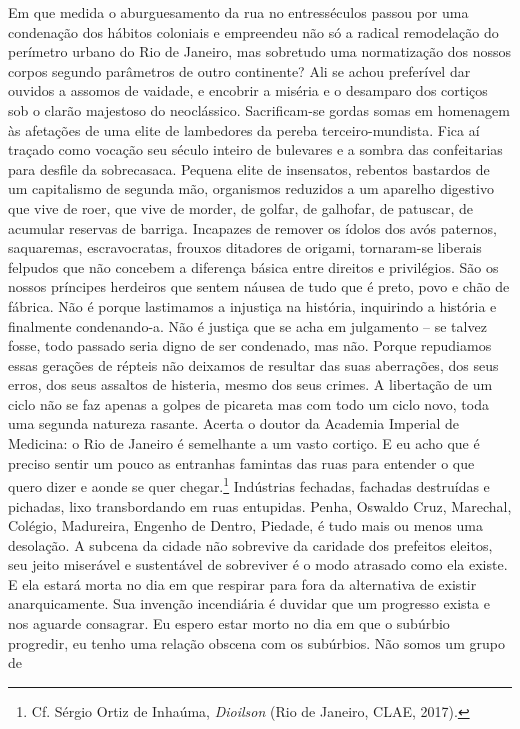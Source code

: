 Em que medida o aburguesamento da rua no entresséculos passou por uma
condenação dos hábitos coloniais e empreendeu não só a radical
remodelação do perímetro urbano do Rio de Janeiro, mas sobretudo uma
normatização dos nossos corpos segundo parâmetros de outro continente?
Ali se achou preferível dar ouvidos a assomos de vaidade, e encobrir a
miséria e o desamparo dos cortiços sob o clarão majestoso do
neoclássico. Sacrificam-se gordas somas em homenagem às afetações de uma
elite de lambedores da pereba terceiro-mundista. Fica aí traçado como
vocação seu século inteiro de bulevares e a sombra das confeitarias para
desfile da sobrecasaca. Pequena elite de insensatos, rebentos bastardos
de um capitalismo de segunda mão, organismos reduzidos a um aparelho
digestivo que vive de roer, que vive de morder, de golfar, de galhofar,
de patuscar, de acumular reservas de barriga. Incapazes de remover os
ídolos dos avós paternos, saquaremas, escravocratas, frouxos ditadores
de origami, tornaram-se liberais felpudos que não concebem a diferença
básica entre direitos e privilégios. São os nossos príncipes herdeiros
que sentem náusea de tudo que é preto, povo e chão de fábrica. Não é
porque lastimamos a injustiça na história, inquirindo a história e
finalmente condenando-a. Não é justiça que se acha em julgamento -- se
talvez fosse, todo passado seria digno de ser condenado, mas não. Porque
repudiamos essas gerações de répteis não deixamos de resultar das suas
aberrações, dos seus erros, dos seus assaltos de histeria, mesmo dos
seus crimes. A libertação de um ciclo não se faz apenas a golpes de
picareta mas com todo um ciclo novo, toda uma segunda natureza rasante.
Acerta o doutor da Academia Imperial de Medicina: o Rio de Janeiro é
semelhante a um vasto cortiço. E eu acho que é preciso sentir um pouco
as entranhas famintas das ruas para entender o que quero dizer e aonde
se quer chegar.\footnote{Cf. Sérgio Ortiz de Inhaúma, \emph{Dioilson}
  (Rio de Janeiro, CLAE, 2017).} Indústrias fechadas, fachadas
destruídas e pichadas, lixo transbordando em ruas entupidas. Penha,
Oswaldo Cruz, Marechal, Colégio, Madureira, Engenho de Dentro, Piedade,
é tudo mais ou menos uma desolação. A subcena da cidade não sobrevive da
caridade dos prefeitos eleitos, seu jeito miserável e sustentável de
sobreviver é o modo atrasado como ela existe. E ela estará morta no dia
em que respirar para fora da alternativa de existir anarquicamente. Sua
invenção incendiária é duvidar que um progresso exista e nos aguarde
consagrar. Eu espero estar morto no dia em que o subúrbio progredir, eu
tenho uma relação obscena com os subúrbios. Não somos um grupo de
